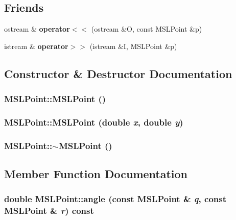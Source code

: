 \subsection*{Friends}
\begin{CompactItemize}
\item 
ostream \& {\bf operator$<$$<$} (ostream \&O, const MSLPoint \&p)
\item 
istream \& {\bf operator$>$$>$} (istream \&I, MSLPoint \&p)
\end{CompactItemize}


\subsection{Constructor \& Destructor Documentation}
\subsubsection{\setlength{\rightskip}{0pt plus 5cm}MSLPoint::MSLPoint ()}\label{classMSLPoint_a0}


\subsubsection{\setlength{\rightskip}{0pt plus 5cm}MSLPoint::MSLPoint (double {\em x}, double {\em y})}\label{classMSLPoint_a1}


\subsubsection{\setlength{\rightskip}{0pt plus 5cm}MSLPoint::$\sim$MSLPoint ()\hspace{0.3cm}{\tt  [inline]}}\label{classMSLPoint_a2}




\subsection{Member Function Documentation}
\subsubsection{\setlength{\rightskip}{0pt plus 5cm}double MSLPoint::angle (const MSLPoint \& {\em q}, const MSLPoint \& {\em r}) const}\label{classMSLPoint_a12}


